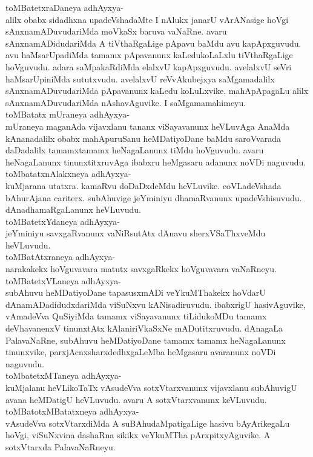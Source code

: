 \documentclass{article}
\begin{document}
toMBatetxraDaneya adhAyxya-\\
alilx obabx sidadhxna upadeVshadaMte I nAlukx janarU vArANasige hoVgi sAnxnamADuvudariMda moVkaSx baruva vaNaRne. avaru sAnxnamADidudariMda A tiVthaRgaLige pApavu baMdu avu kapApxguvudu. avu haMsarUpadiMda tamamx pApavanunx kaLedukoLaLxlu tiVthaRgaLige hoVguvudu. adara saMpakaRdiMda elalxvU kapApxguvudu. avelalxvU seVri haMsarUpiniMda sututxvudu. avelalxvU reVvAkubejxya saMgamadalilx sAnxnamADuvudariMda pApavanunx kaLedu koLuLxvike. mahApApagaLu alilx sAnxnamADuvudariMda nAshavAguvike. I saMgamamahimeyu.\\
toMBatatx mUraneya adhAyxya-\\
mUraneya maganAda vijavxlanu tananx viSayavanunx heVLuvAga AnaMda kAnanadalilx obabx mahApuruSanu heMDatiyoDane baMdu saroVvarada daDadalilx tamamxtamamx heNagaLanunx tiMdu hoVguvudu. avaru heNagaLanunx tinunxtitxruvAga ibabxru heMgasaru adanunx noVDi naguvudu.\\
toMbatatxnAlakxneya adhAyxya-\\
kuMjarana utatxra. kamaRvu doDaDxdeMdu heVLuvike. coVLadeVshada bAhurAjana cariterx. subAhuvige jeYminiyu dhamaRvanunx upadeVshisuvudu. dAnadhamaRgaLanunx heVLuvudu.\\
toMBatetxYdaneya adhAyxya-\\
jeYminiyu savxgaRvanunx vaNiRsutAtx dAnavu sherxVSaThxveMdu heVLuvudu.\\
toMBatAtxraneya adhAyxya-\\
narakakekx hoVguvavara matutx savxgaRkekx hoVguvavara vaNaRneyu.\\
toMBatetxVLaneya adhAyxya-\\
subAhuvu heMDatiyoDane tapasusxmADi veYkuMThakekx hoVdarU dAnamADadidudxdariMda viSuNxvu kANisadiruvudu. ibabxrigU hasivAguvike, vAmadeVva QuSiyiMda tamamx viSayavanunx tiLidukoMDu tamamx deVhavanenxV tinunxtAtx kAlaniriVkaSxNe mADutitxruvudu. dAnagaLa PalavaNaRne, subAhuvu heMDatiyoDane tamamx tamamx heNagaLanunx tinunxvike, parxjAcnxsharxdedhxgaLeMba heMgasaru avaranunx noVDi naguvudu.\\
toMbatetxMTaneya adhAyxya-\\
kuMjalanu heVLikoTaTx vAsudeVva sotxVtarxvanunx vijavxlanu subAhuvigU avana heMDatigU heVLuvudu. avaru A sotxVtarxvanunx keVLuvudu.\\
toMBatotxMBatatxneya adhAyxya-\\
vAsudeVva sotxVtarxdiMda A suBAhudaMpatigaLige hasivu bAyArikegaLu hoVgi, viSuNxvina dashaRna sikikx veYkuMTha pArxpitxyAguvike. A sotxVtarxda PalavaNaRneyu.\\
\end{document}
